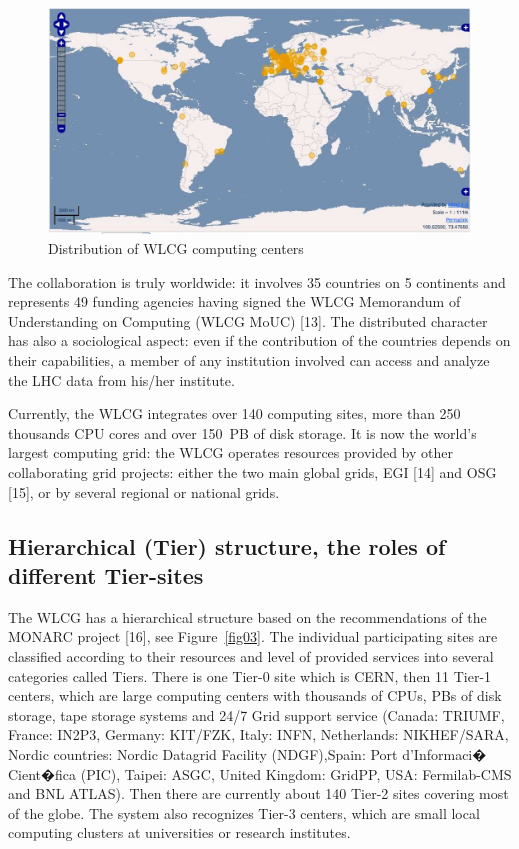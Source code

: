 \begin{figure}[htb] %
\centering
\includegraphics[width=13cm]{fig02.eps} %
\caption{Distribution of WLCG computing centers}\label{fig02}
\end{figure}



The collaboration is truly worldwide: it involves 35 countries on 5
continents and represents 49 funding agencies having signed the WLCG
Memorandum of Understanding on Computing (WLCG MoUC) [13]. The
distributed character has also a sociological aspect: even if the contribution 
of the countries depends on  their capabilities, a member of any
institution involved can access and analyze the LHC data from
his/her institute.

Currently, the WLCG integrates over 140 computing sites, more than
250 thousands CPU cores and over 150~PB of disk storage. It is now
the world's largest computing grid: the WLCG operates resources
provided by other collaborating grid projects: either the two main
global grids, EGI [14] and OSG [15], or by several regional or
national grids.

\subsection{Hierarchical (Tier) structure, the roles of different
Tier-sites}
%
The WLCG has a hierarchical structure based on the
recommendations of the  MONARC project [16], see Figure~\ref{fig03}.
The individual participating sites are  classified according to their
resources and level of provided services into several categories
called Tiers. There is one Tier-0 site  which is CERN, then 11 Tier-1
centers, which are large computing centers with thousands of CPUs,
PBs of disk storage, tape storage  systems and 24/7 Grid support
service (Canada: TRIUMF, France: IN2P3, Germany: KIT/FZK,  Italy: INFN,
 Netherlands: NIKHEF/SARA,  Nordic countries: Nordic Datagrid Facility (NDGF),Spain: Port d'Informaci�
Cient�fica (PIC),  Taipei:
ASGC, United Kingdom: GridPP,  USA: Fermilab-CMS and BNL ATLAS).
Then there are currently about 140 Tier-2 sites covering most of the
globe. The system also recognizes Tier-3 centers, which are small
local computing clusters at universities or research institutes.

